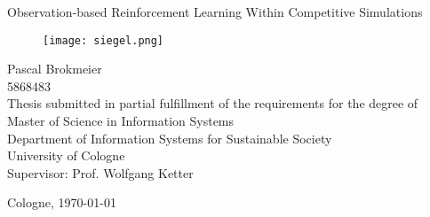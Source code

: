 \begin{titlepage}
\setlength{\parindent}{0pt} %
\begin{center}

\Huge{Observation-based Reinforcement Learning Within Competitive Simulations}

\vspace{10mm}
\begin{figure}[!h]
    \centering
    \texttt{[image: siegel.png]}
\end{figure}

\vspace{30mm}

\small{
Pascal Brokmeier \\ 5868483 \\
}
\vspace{5mm}
\small{Thesis submitted in partial fulfillment of the requirements for the degree of \\Master of Science in Information
Systems\\}
\vspace{5mm}
\small{Department of Information Systems for Sustainable Society \\
University of Cologne\\
Supervisor: Prof.  Wolfgang Ketter }

\vspace{5mm}
Cologne, \today
{}
\end{center}
\end{titlepage}
